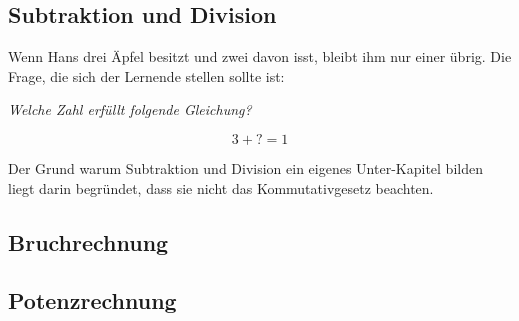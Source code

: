 \subsection{Subtraktion und Division}

Wenn Hans drei Äpfel besitzt und zwei davon isst, bleibt ihm nur einer übrig. Die Frage, die sich der Lernende stellen sollte ist:

\textsl{Welche Zahl erfüllt folgende Gleichung?}

\[3 + ? = 1\]







Der Grund warum Subtraktion und Division ein eigenes Unter-Kapitel bilden liegt darin begründet, dass sie nicht das Kommutativgesetz beachten. 

\subsection{Bruchrechnung}

\subsection{Potenzrechnung}

